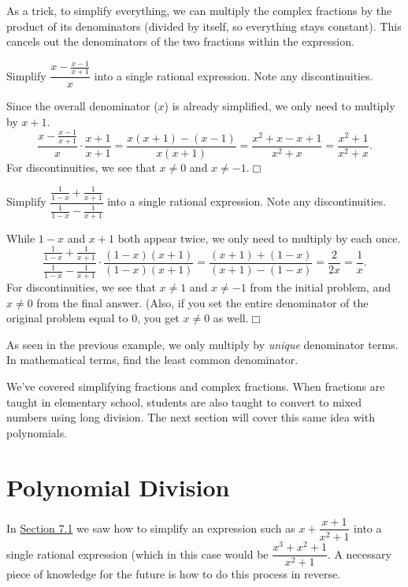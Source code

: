 \documentclass[lang=en,11pt]{elegantbook}
\begin{document}
As a trick, to simplify everything, we can multiply the complex fractions by the product of its denominators (divided by itself, so everything stays constant). This cancels out the denominators of the two fractions within the expression.
\begin{example}
Simplify $\dfrac{x-\frac{x-1}{x+1}}{x}$ into a single rational expression.  Note any discontinuities.
\end{example}
\begin{solution}
Since the overall denominator ($x$) is already simplified, we only need to multiply by $x+1$. $$\dfrac{x-\frac{x-1}{x+1}}{x}\cdot\dfrac{x+1}{x+1}=\dfrac{x(x+1)-(x-1)}{x(x+1)}=\dfrac{x^2+x-x+1}{x^2+x}=\dfrac{x^2+1}{x^2+x}.$$ For discontinuities, we see that $x\neq 0$ and $x\neq -1$.$\Box$
\end{solution}
\begin{example}
Simplify $\dfrac{\frac{1}{1-x}+\frac{1}{x+1}}{\frac{1}{1-x}-\frac{1}{x+1}}$ into a single rational expression.  Note any discontinuities.
\end{example}
\begin{solution}
While $1-x$ and $x+1$ both appear twice, we only need to multiply by each once.
$$\dfrac{\frac{1}{1-x}+\frac{1}{x+1}}{\frac{1}{1-x}-\frac{1}{x+1}}\cdot\dfrac{(1-x)(x+1)}{(1-x)(x+1)}=\dfrac{(x+1)+(1-x)}{(x+1)-(1-x)}=\dfrac{2}{2x}=\dfrac{1}{x}.$$ For discontinuities, we see that $x\neq 1$ and $x\neq -1$ from the initial problem, and $x\neq 0$ from the final answer.  (Also, if you set the entire denominator of the original problem equal to $0$, you get $x\neq 0$ as well.$\Box$
\end{solution}
\begin{remark}
As seen in the previous example, we only multiply by \textit{unique} denominator terms.  In mathematical terms, find the least common denominator.
\end{remark}
We've covered simplifying fractions and complex fractions.  When fractions are taught in elementary school, students are also taught to convert to mixed numbers using long division.  The next section will cover this same idea with polynomials.
\section{Polynomial Division}
\noindent In \hyperlink{section.7.1}{Section 7.1} we saw how to simplify an expression such as $x+\dfrac{x+1}{x^2+1}$ into a single rational expression (which in this case would be $\dfrac{x^3+x^2+1}{x^2+1}$. A necessary piece of knowledge for the future is how to do this process in reverse.
\end{document}
